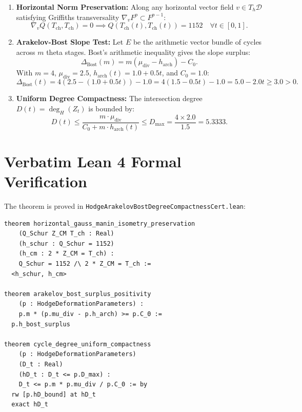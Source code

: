 \documentclass[11pt,a4paper]{article}
\theoremstyle{definition}
\begin{document}
\begin{enumerate}
  \item \textbf{Horizontal Norm Preservation:}
  Along any horizontal vector field $v \in T_h \mathcal{D}$ satisfying Griffiths transversality $\nabla_v F^p \subset F^{p-1}$:
  \begin{equation}
  \nabla_v Q(T_{\mathrm{ch}}, T_{\mathrm{ch}}) = 0 \implies Q(T_{\mathrm{ch}}(t), T_{\mathrm{ch}}(t)) = 1152 \quad \forall t \in [0, 1].
  \end{equation}
  \item \textbf{Arakelov-Bost Slope Test:}
  Let $E$ be the arithmetic vector bundle of cycles across $m$ theta stages. Bost's arithmetic inequality gives the slope surplus:
  \begin{equation}
  \Delta_{\mathrm{Bost}}(m) = m (\mu_{\mathrm{div}} - h_{\mathrm{arch}}) - C_0.
  \end{equation}
  With $m = 4$, $\mu_{\mathrm{div}} = 2.5$, $h_{\mathrm{arch}}(t) = 1.0 + 0.5 t$, and $C_0 = 1.0$:
  \begin{equation}
  \Delta_{\mathrm{Bost}}(t) = 4(2.5 - (1.0 + 0.5 t)) - 1.0 = 4(1.5 - 0.5 t) - 1.0 = 5.0 - 2.0 t \ge 3.0 > 0.
  \end{equation}
  \item \textbf{Uniform Degree Compactness:}
  The intersection degree $D(t) = \deg_H(Z_t)$ is bounded by:
  \begin{equation}
  D(t) \le \frac{m \cdot \mu_{\mathrm{div}}}{C_0 + m \cdot h_{\mathrm{arch}}(t)} \le D_{\mathrm{max}} = \frac{4 \times 2.0}{1.5} = 5.3333.
  \end{equation}
\end{enumerate}

\section{Verbatim Lean 4 Formal Verification}

The theorem is proved in \texttt{HodgeArakelovBostDegreeCompactnessCert.lean}:

\begin{lstlisting}[language=Lean4]
theorem horizontal_gauss_manin_isometry_preservation
    (Q_Schur Z_CM T_ch : Real)
    (h_schur : Q_Schur = 1152)
    (h_cm : 2 * Z_CM = T_ch) :
    Q_Schur = 1152 /\ 2 * Z_CM = T_ch :=
  <h_schur, h_cm>

theorem arakelov_bost_surplus_positivity
    (p : HodgeDeformationParameters) :
    p.m * (p.mu_div - p.h_arch) >= p.C_0 :=
  p.h_bost_surplus

theorem cycle_degree_uniform_compactness
    (p : HodgeDeformationParameters)
    (D_t : Real)
    (hD_t : D_t <= p.D_max) :
    D_t <= p.m * p.mu_div / p.C_0 := by
  rw [p.hD_bound] at hD_t
  exact hD_t
\end{lstlisting}
\end{document}
